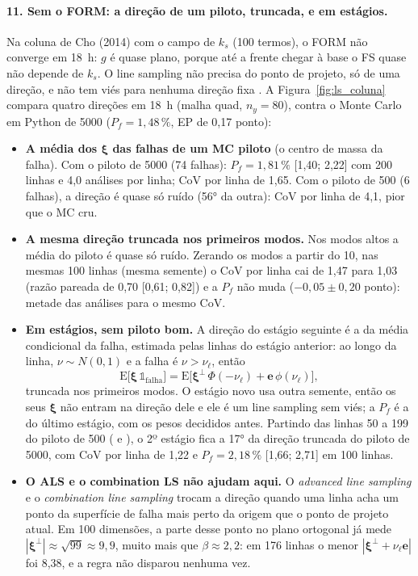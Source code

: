 \documentclass[11pt,a4paper]{article}
\newcommand{\xib}{\bm\xi}
\begin{document}
\paragraph{11. Sem o FORM: a direção de um piloto, truncada, e em estágios.} Na coluna de Cho (2014) com o campo de $k_s$
(100 termos), o FORM não converge em 18~h: $g$ é quase plano, porque até a frente chegar à base o FS quase não depende de
$k_s$. O line sampling não precisa do ponto de projeto, só de uma direção, e não tem viés para nenhuma direção fixa
\citep{koutsourelakis2004}. A Figura~\ref{fig:ls_coluna} compara quatro direções em 18~h (malha quad, $n_y = 80$),
contra o Monte Carlo em Python de 5000 ($P_f = 1{,}48\,\%$, EP de 0,17 ponto):
\begin{itemize}
  \item \textbf{A média dos $\xib$ das falhas de um MC piloto} (o centro de massa da falha). Com o piloto de 5000 (74
    falhas): $P_f = 1{,}81\,\%$ [1,40; 2,22] com 200 linhas e 4,0 análises por linha; CoV por linha de 1,65. Com o piloto de
    500 (6 falhas), a direção é quase só ruído (56° da outra): CoV por linha de 4,1, pior que o MC cru.
  \item \textbf{A mesma direção truncada nos primeiros modos.} Nos modos altos a média do piloto é quase só ruído. Zerando os
    modos a partir do 10, nas mesmas 100 linhas (mesma semente) o CoV por linha cai de 1,47 para 1,03 (razão pareada de
    0,70 [0,61; 0,82]) e a $P_f$ não muda ($-0{,}05 \pm 0{,}20$ ponto): metade das análises para o mesmo CoV.
  \item \textbf{Em estágios, sem piloto bom.} A direção do estágio seguinte é a da média condicional da falha, estimada
    pelas linhas do estágio anterior: ao longo da linha, $\nu \sim N(0,1)$ e a falha é $\nu > \nu_\ell$, então
    \begin{equation}
      \mathrm{E}\big[\xib\,\mathbb 1_{\mathrm{falha}}\big] = \mathrm{E}\big[\xib^\perp\,\Phi(-\nu_\ell) + \bm e\,\phi(\nu_\ell)\big],
      \label{eq:lsestagio}
    \end{equation}
    truncada nos primeiros modos. O estágio novo usa outra semente, então os seus $\xib$ não entram na direção dele e ele
    é um line sampling sem viés; a $P_f$ é a do último estágio, com os pesos decididos antes. Partindo das linhas 50 a 199
    do piloto de 500 ( e ), o 2º estágio fica a 17° da direção truncada do piloto
    de 5000, com CoV por linha de 1,22 e $P_f = 2{,}18\,\%$ [1,66; 2,71] em 100 linhas.
  \item \textbf{O ALS e o combination LS não ajudam aqui.} O \emph{advanced line sampling} \citep{deangelis2015} e o
    \emph{combination line sampling} \citep{papaioannou2021} trocam a direção quando uma linha acha um ponto da superfície
    de falha mais perto da origem que o ponto de projeto atual. Em 100 dimensões, a parte desse ponto no plano ortogonal já
    mede $|\xib^\perp| \approx \sqrt{99} \approx 9{,}9$, muito mais que $\beta \approx 2{,}2$: em 176 linhas o menor
    $|\xib^\perp + \nu_\ell\bm e|$ foi 8,38, e a regra não disparou nenhuma vez.
\end{itemize}
\end{document}
